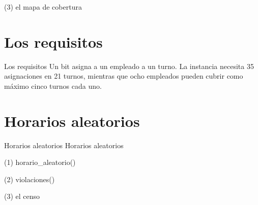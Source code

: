 \begin{frame}[fragile]{(3) el mapa de cobertura}

\end{frame}


\section{Los requisitos}

\begin{frame}{Los requisitos}
Un bit asigna a un empleado a un turno. La instancia necesita 35 asignaciones
en 21 turnos, mientras que ocho empleados pueden cubrir como máximo cinco turnos cada uno.
\end{frame}


\section{Horarios aleatorios}

\begin{frame}{Horarios aleatorios}
Horarios aleatorios
\end{frame}

\begin{frame}[fragile]{(1) horario\_aleatorio()}

\end{frame}

\begin{frame}[fragile]{(2) violaciones()}

\end{frame}

\begin{frame}[fragile]{(3) el censo}

\end{frame}

